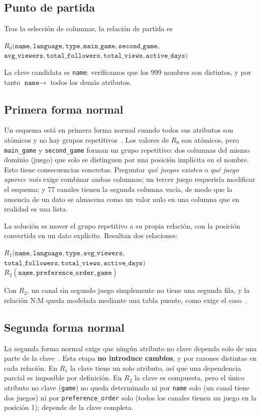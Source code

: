 \documentclass[conference]{IEEEtran}
\begin{document}
\subsection{Punto de partida}
Tras la selección de columnas, la relación de partida es
\begin{center}
\footnotesize
$R_0(\underline{\texttt{name}}, \texttt{language}, \texttt{type}, \texttt{main\_game}, \texttt{second\_game},$\\
$\texttt{avg\_viewers}, \texttt{total\_followers}, \texttt{total\_views}, \texttt{active\_days})$
\end{center}
La clave candidata es \texttt{name}: verificamos que los 999 nombres son distintos, y por tanto $\texttt{name} \rightarrow$ todos los demás atributos.

\subsection{Primera forma normal}
Un esquema está en primera forma normal cuando todos sus atributos son atómicos y no hay grupos repetitivos~\cite{codd70,elmasri16}. Los valores de $R_0$ son atómicos, pero \texttt{main\_game} y \texttt{second\_game} forman un grupo repetitivo: dos columnas del mismo dominio (juego) que solo se distinguen por una posición implícita en el nombre. Esto tiene consecuencias concretas. Preguntar \emph{qué juegos existen} o \emph{qué juego aparece más} exige combinar ambas columnas; un tercer juego requeriría modificar el esquema; y 77 canales tienen la segunda columna vacía, de modo que la ausencia de un dato se almacena como un valor nulo en una columna que en realidad es una lista.

La solución es mover el grupo repetitivo a su propia relación, con la posición convertida en un dato explícito. Resultan dos relaciones:
\begin{center}
\footnotesize
$R_1(\underline{\texttt{name}}, \texttt{language}, \texttt{type}, \texttt{avg\_viewers},$\\
$\texttt{total\_followers}, \texttt{total\_views}, \texttt{active\_days})$\\[2pt]
$R_2(\underline{\texttt{name}}, \underline{\texttt{preference\_order}}, \texttt{game})$
\end{center}
Con $R_2$, un canal sin segundo juego simplemente no tiene una segunda fila, y la relación N:M queda modelada mediante una tabla puente, como exige el caso~\cite{elmasri16}.

\subsection{Segunda forma normal}
La segunda forma normal exige que ningún atributo no clave dependa solo de una parte de la clave~\cite{codd72}. Esta etapa \textbf{no introduce cambios}, y por razones distintas en cada relación. En $R_1$ la clave tiene un solo atributo, así que una dependencia parcial es imposible por definición. En $R_2$ la clave es compuesta, pero el único atributo no clave (\texttt{game}) no queda determinado ni por \texttt{name} solo (un canal tiene dos juegos) ni por \texttt{preference\_order} solo (todos los canales tienen un juego en la posición 1); depende de la clave completa.
\end{document}
